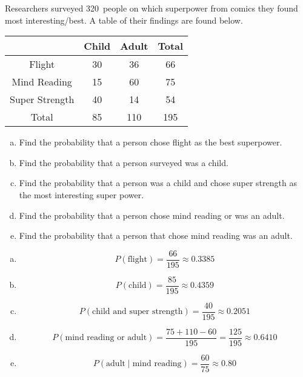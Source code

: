 \documentclass[11pt,letterpaper]{article}
\begin{document}

 Researchers surveyed 320~people on which superpower from comics they found most interesting/best. A table of their findings are found below.
	\begin{table}[!ht]
	\centering
	\begin{tabular}{|c||c|c||c|} \hline
	& Child & Adult & Total \\ \hline \hline
	Flight & 30 & 36 & 66 \\ \hline
	Mind Reading & 15 & 60 & 75 \\ \hline
	Super Strength & 40 & 14 & 54 \\ \hline \hline
	Total & 85 & 110 & 195 \\ \hline
	\end{tabular}
	\end{table}

\begin{enumerate}[(a)]
\item Find the probability that a person chose flight as the best superpower.
\item Find the probability that a person surveyed was a child.
\item Find the probability that a person was a child and chose super strength as the most interesting super power.
\item Find the probability that a person chose mind reading or was an adult.
\item Find the probability that a person that chose mind reading was an adult. 
\end{enumerate} \pspace

\sol 
\begin{enumerate}[(a)]
\item 
	\[
	P(\text{flight})= \dfrac{66}{195} \approx 0.3385
	\]

\item 
	\[
	P(\text{child})= \dfrac{85}{195} \approx 0.4359
	\]

\item 
	\[
	P(\text{child and super strength})= \dfrac{40}{195} \approx 0.2051
	\]

\item 
	\[
	P(\text{mind reading or adult})= \dfrac{75 + 110 - 60}{195}= \dfrac{125}{195} \approx 0.6410
	\]

\item 
	\[
	P(\text{adult} \;|\; \text{mind reading})= \dfrac{60}{75} \approx 0.80
	\]
\end{enumerate}
\end{document}
